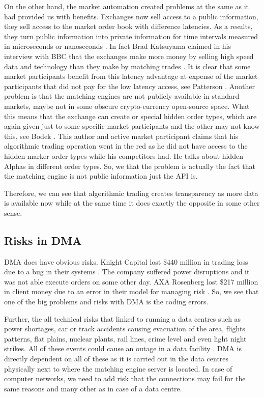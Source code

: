 \documentclass[12pt]{article}
\begin{document}
On the other hand, the market automation created problems at the same as it had provided us with benefits. Exchanges now sell access to a public information, they sell access to the market order book with difference latencies. As a results, they turn public information into private information for time intervals measured in microseconds or nanoseconds \cite{ohara}. In fact Brad Katsuyama claimed in his interview with BBC that the exchanges make more money by selling high speed data and technology than they make by matching trades . It is clear that some market participants benefit from this latency advantage at expense of the market participants that did not pay for the low latency access, see Patterson \cite{patterson}. Another problem is that the matching engines are not publicly available in standard markets, maybe not in some obscure crypto-currency open-source space. What this means that the exchange can create or special hidden order types, which are again given just to some specific market participants and the other may not know this, see Bodek \cite{bodek}. This author and active market participant claims that his algorithmic trading operation went in the red as he did not have access to the hidden marker order types while his competitors had. He talks about hidden Alphas in different order types. So, we that the problem is actually the fact that the matching engine is not public information just the API is.

Therefore, we can see that algorithmic trading creates transparency as more data is available now while at the same time it does exactly the opposite in some other sense.
\subsection*{Risks in DMA}
DMA does have obvious risks. Knight Capital lost \$440 million in trading loss due to a bug in their systems \cite{nytimes}. The company suffered power disruptions and it was not able execute orders on some other day. AXA Rosenberg lost \$217 million in client money due to an error in their model for managing risk \cite{cbs}. So, we see that one of the big problems and risks with DMA is the coding errors.

Further, the all technical risks that linked to running a data centres such as power shortages, car or track accidents causing evacuation of the area, flights patterns, flat plains, nuclear plants, rail lines, crime level and even light night strikes. All of these events could cause an outage in a data facility \cite{vpro}. DMA is directly dependent on all of these as it is carried out in the data centres physically next to where the matching engine server is located. In case of computer networks, we need to add risk that the connections may fail for the same reasons and many other as in case of a data centre.
\end{document}
